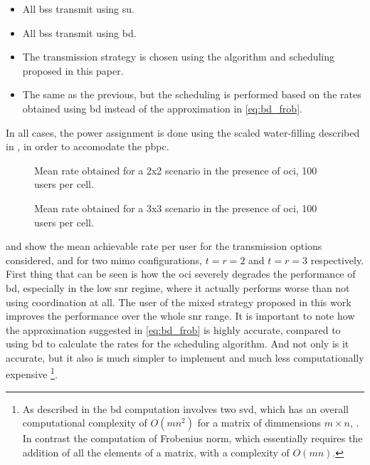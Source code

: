 \begin{itemize}
    \item All \glspl{bs} transmit using \gls{su}.
    \item All \glspl{bs} transmit using \gls{bd}.
    \item The transmission strategy is chosen using the algorithm and scheduling
        proposed in this paper.
    \item The same as the previous, but the scheduling is performed based on the
        rates obtained using \gls{bd} instead of the approximation in
        \eqref{eq:bd_frob}.
\end{itemize}

In all cases, the power assignment is done using the scaled water-filling
described in , in order to accomodate the \gls{pbpc}.

\begin{figure}[t]
    \centering
    \begin{minipage}[t]{0.7\textwidth}
        
    \end{minipage}
\caption{Mean rate obtained for a 2x2 scenario in the presence of \gls{oci}, 100
users per cell.}
\label{fig:mean_rate_2x2}
\end{figure}

\begin{figure}[t]
    \centering
    \begin{minipage}[t]{0.7\textwidth}
        
    \end{minipage}
\caption{Mean rate obtained for a 3x3 scenario in the presence of \gls{oci}, 100
users per cell.}
\label{fig:mean_rate_3x3}
\end{figure}

 and  show the mean achievable
rate per user for the transmission options considered, and for two \gls{mimo}
configurations, $t=r=2$ and $t=r=3$ respectively. First thing that can be seen
is how the \gls{oci} severely degrades the performance of \gls{bd}, especially
in the low \gls{snr} regime, where it actually performs worse than not using
coordination at all. The user of the mixed strategy proposed in this work
improves the performance over the whole \gls{snr} range. It is important to note
how the approximation suggested in \eqref{eq:bd_frob} is highly accurate,
compared to using \gls{bd} to calculate the rates for the scheduling algorithm.
And not only is it accurate, but it also is much simpler to implement and much
less computationally expensive
\footnote{As described in  the \gls{bd} computation
involves two \gls{svd}, which has an overall computational complexity of
$O\left(mn^2\right)$ for a matrix of dimmensions $m \times n$,
\cite{golub2012matrix}. In contrast the computation of Frobenius norm, which
essentially requires the addition of all the elements of a matrix, with a
complexity of $O\left(mn\right)$.}.

